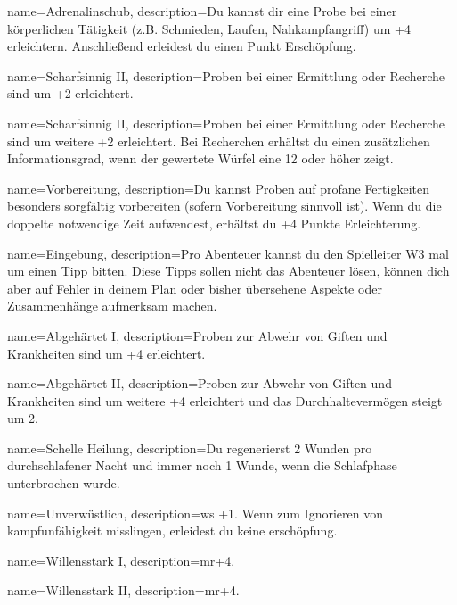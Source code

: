 {
    name={Adrenalinschub},
    description={Du kannst dir eine Probe bei einer körperlichen Tätigkeit (z.B. Schmieden, Laufen, Nahkampfangriff) um +4 erleichtern. Anschließend erleidest du einen Punkt Erschöpfung.}}
        
{
    name={Scharfsinnig II},
    description={Proben bei einer Ermittlung oder Recherche sind um +2 erleichtert.}}

{
    name={Scharfsinnig II},
    description={Proben bei einer Ermittlung oder Recherche sind um weitere +2 erleichtert. Bei Recherchen erhältst du einen zusätzlichen Informationsgrad, wenn der gewertete Würfel eine 12 oder höher zeigt.}}

{
    name={Vorbereitung},
    description={Du kannst Proben auf profane Fertigkeiten besonders sorgfältig vorbereiten (sofern Vorbereitung sinnvoll ist). Wenn du die doppelte notwendige Zeit aufwendest, erhältst du +4 Punkte Erleichterung.}}

{
    name={Eingebung},
    description={Pro Abenteuer kannst du den Spielleiter W3 mal um einen Tipp bitten. Diese Tipps sollen nicht das Abenteuer lösen, können dich aber auf Fehler in deinem Plan oder bisher übersehene Aspekte oder Zusammenhänge aufmerksam machen.}}

{
    name={Abgehärtet I},
    description={Proben zur Abwehr von Giften und Krankheiten sind um +4 erleichtert.}}

{
    name={Abgehärtet II},
    description={Proben zur Abwehr von Giften und Krankheiten sind um weitere +4 erleichtert und das Durchhaltevermögen steigt um 2.}}

{
    name={Schelle Heilung},
    description={Du regenerierst 2 Wunden pro durchschlafener Nacht und immer noch 1 Wunde, wenn die Schlafphase unterbrochen wurde.}}
        
{
    name={Unverwüstlich},
    description={\gls{ws} +1. Wenn  zum Ignorieren von \gls{kampfunfähigkeit} misslingen, erleidest du keine \gls{erschöpfung}.}}

{
    name={Willensstark I},
    description={\gls{mr}+4.}}

{
    name={Willensstark II},
    description={\gls{mr}+4.}}

